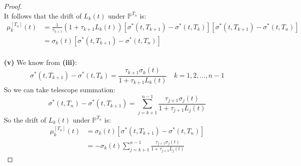 \documentclass[a4paper, 10pt]{article}
\theoremstyle{definition}
\theoremstyle{hSol}
\begin{document}
\begin{proof}
\begin{equation}
\end{equation}
It follows that the drift of $L_k(t)$ under $\mathbb{P}^{T_n}$ is:
\begin{equation}
  \begin{split}
    \mu_k^{[T_n]}(t) &= \frac{1}{\tau_{k+1}}\left(1+\tau_{k+1}L_k(t)\right)\left[\sigma^*(t,T_{k+1})-\sigma^*(t,T_{k})\right]\left[\sigma^*(t,T_{k+1})-\sigma^*(t,T_{n})\right]\\
    &=\sigma_k(t)\left[\sigma^*(t,T_{k+1})-\sigma^*(t,T_{n})\right]
  \end{split}
\end{equation}
~\\
\textbf{(v)} We know from \textbf{(iii)}:
\begin{equation}
  \sigma^*(t,T_{k+1})-\sigma^*(t,T_{k}) = \frac{\tau_{k+1}\sigma_k(t)}{1+\tau_{k+1}L_k(t)}\quad k = 1, 2, ..., n-1
\end{equation}
So we can take telescope summation:
\begin{equation}
  \sigma^*(t,T_{n})-\sigma^*(t,T_{k+1}) = \sum_{j=k+1}^{n-1} \frac{\tau_{j+1}\sigma_j(t)}{1+\tau_{j+1}L_j(t)}
\end{equation}
So the drift of $L_k(t)$ under $\mathbb{P}^{T_n}$ is:
\begin{equation}
  \begin{split}
    \mu_k^{[T_n]}(t) &=\sigma_k(t)\left[\sigma^*(t,T_{k+1})-\sigma^*(t,T_{n})\right] \\
    &= -\sigma_k(t)\sum_{j=k+1}^{n-1} \frac{\tau_{j+1}\sigma_j(t)}{1+\tau_{j+1}L_j(t)}
  \end{split}
\end{equation}
\end{proof}
\end{document}
